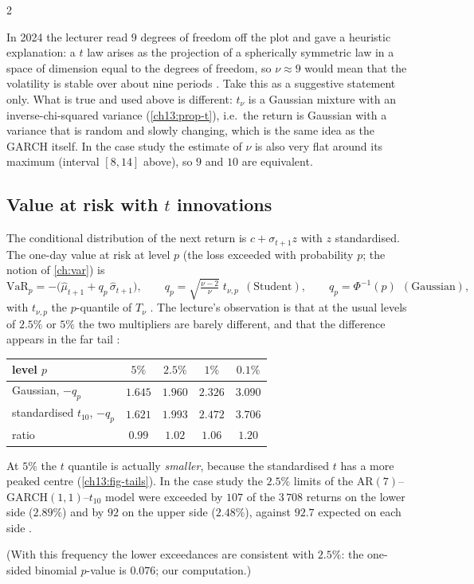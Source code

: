 \begin{paracol}{2}
\begin{coursenote}\label{ch13:cn-nine}
In 2024 the lecturer read $9$ degrees of freedom off the plot and gave a heuristic explanation: a $t$ law arises as the projection of a spherically symmetric law in a space of dimension equal to the degrees of freedom, so
$\nu\approx9$ would mean that the volatility is stable over about nine periods . Take this as a suggestive statement only. What is true and used above is different: $t_\nu$ is a Gaussian mixture with an inverse-chi-squared variance (\cref{ch13:prop-t}), i.e.\ the return is Gaussian with a variance that is random and
slowly changing, which is the same idea as the GARCH itself. In the case study the estimate of $\nu$ is also very flat around its maximum (interval $[8,14]$ above), so $9$ and $10$ are equivalent.
\end{coursenote}

\subsection{Value at risk with $t$ innovations}\label{ch13:sec-var}
The conditional distribution of the next return is $c+\sigma_{t+1}z$ with $z$ standardised. The one-day value at risk at level $p$ (the loss exceeded with probability $p$; the notion of \cref{ch:var}) is
\begin{equation}\label{ch13:eq-var}
  \mathrm{VaR}_p=-\bigl(\hat\mu_{t+1}+q_p\,\hat\sigma_{t+1}\bigr),\qquad q_p=\sqrt{\tfrac{\nu-2}{\nu}}\;t_{\nu,p}\ \ (\text{Student}),\qquad q_p=\Phi^{-1}(p)\ \ (\text{Gaussian}),
\end{equation}
with $t_{\nu,p}$ the $p$-quantile of $T_\nu$ . The lecture's observation is that at the usual levels of $2.5\%$ or $5\%$ the two multipliers are barely different, and that the difference appears in the far tail :
\begin{center}\small
\begin{tabular}{@{}lcccc@{}}
\toprule
level $p$ & $5\%$ & $2.5\%$ & $1\%$ & $0.1\%$\\
\midrule
Gaussian, $-q_p$ & $1.645$ & $1.960$ & $2.326$ & $3.090$\\
standardised $t_{10}$, $-q_p$ & $1.621$ & $1.993$ & $2.472$ & $3.706$\\
ratio & $0.99$ & $1.02$ & $1.06$ & $1.20$\\
\bottomrule
\end{tabular}
\end{center}
At $5\%$ the $t$ quantile is actually \emph{smaller}, because the standardised $t$ has a more peaked centre (\cref{ch13:fig-tails}). In the case study the $2.5\%$ limits of the AR$(7)$--GARCH$(1,1)$--$t_{10}$ model were exceeded by $107$ of the $3\,708$ returns on the lower side ($2.89\%$) and by $92$ on the upper side
($2.48\%$), against $92.7$ expected on each side .
\begin{secondary}
(With this frequency the lower exceedances are consistent with $2.5\%$: the one-sided binomial $p$-value is $0.076$; our computation.)
\end{secondary}


\end{paracol}
